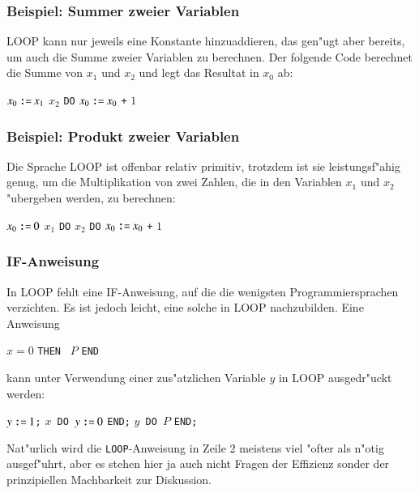 \subsubsection{Beispiel: Summer zweier Variablen}
LOOP kann nur jeweils eine Konstante hinzuaddieren, das gen"ugt aber
bereits, um auch die Summe zweier Variablen zu berechnen. Der folgende
Code berechnet die Summe von $x_1$ und $x_2$ und legt das Resultat in
$x_0$ ab:
\begin{algorithmic}
\STATE $x_0 \mathbin{\texttt{:=}} x_1$
 $x_2$ {\tt DO}
\STATE{\tt \ \ \ \ }$x_0 \mathbin{\texttt{:=}} x_0$ {\tt +} $1$
\end{algorithmic}

\subsubsection{Beispiel: Produkt zweier Variablen}
Die Sprache LOOP ist offenbar relativ primitiv, trotzdem
ist sie leistungsf"ahig genug, um die Multiplikation von zwei
Zahlen, die in den Variablen $x_1$ und $x_2$ "ubergeben werden,
zu berechnen:

\begin{algorithmic}
\STATE $x_0 \mathbin{\texttt{:=}} 0$
 $x_1$ {\tt DO}
 $x_2$ {\tt DO}
\STATE{\tt \ \ \ \ \ \ \ \ }$x_0 \mathbin{\texttt{:=}} x_0$ {\tt +} $1$
\end{algorithmic}

\subsubsection{IF-Anweisung}
In LOOP fehlt eine IF-Anweisung, auf die die wenigsten Programmiersprachen
verzichten. Es ist jedoch leicht, eine solche in LOOP nachzubilden.
Eine Anweisung
\begin{algorithmic}
 $x = 0$ {\tt THEN } $P$ {\tt END}
\end{algorithmic}
kann unter Verwendung einer zus"atzlichen Variable $y$ in LOOP ausgedr"uckt
werden:
\begin{algorithmic}[1]
\STATE $y \mathbin{\texttt{:=}} 1${\tt ;}
$x${\tt\ DO }$y \mathbin{\texttt{:=}} 0$ {\tt END;}
$y${\tt\ DO }$P$ {\tt END;}
\end{algorithmic}
Nat"urlich wird die {\tt LOOP}-Anweisung in Zeile 2 meistens viel "ofter
als n"otig ausgef"uhrt, aber es stehen hier ja auch nicht Fragen
der Effizienz sonder der prinzipiellen Machbarkeit zur Diskussion.

